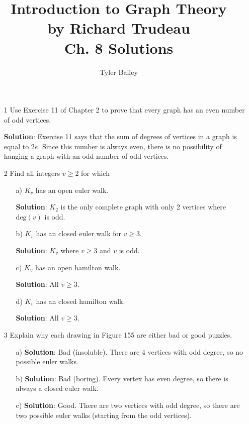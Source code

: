 \documentclass{article}
\begin{document}
	\title{%
  	Introduction to Graph Theory \\
  		\large by Richard Trudeau \\
   		Ch. 8 Solutions}
   		\author{Tyler Bailey}
	\maketitle

	\begin{enumerate}
		\item[1] Use Exercise 11 of Chapter 2 to prove that every graph has an even number of odd vertices.

		\textbf{Solution}: Exercise 11 says that the sum of degrees of vertices in a graph is equal to $2e$. Since this number is always even, there is no possibility of hanging a graph with an odd number of odd vertices. 
		
		\item[2] Find all integers $v \geq 2$ for which
		\begin{enumerate}
			\item[a)] $K_v$ has an open euler walk.

			\textbf{Solution}: $K_2$ is the only complete graph with only 2 vertices where $\mathrm{deg}(v)$ is odd.
							
			\item[b)] $K_v$ has an closed euler walk for $v \geq 3$.
			
			\textbf{Solution}: $K_v$ where $v \geq 3$ and $v$ is odd.
			
			\item[c)] $K_v$ has an open hamilton walk.
			
			\textbf{Solution}: All $v \geq 3$.
			
			\item[d)] $K_v$ has an closed hamilton walk.
			
			\textbf{Solution}: All $v \geq 3$.
		\end{enumerate}
		
		\item[3] Explain why each drawing in Figure 155 are either bad or good puzzles.
		\begin{enumerate}
			\item[a)] \textbf{Solution}: Bad (insoluble). There are 4 vertices with odd degree, so no possible euler walks.
			\item[b)] \textbf{Solution}: Bad (boring). Every vertex has even degree, so there is always a closed euler walk.
			\item[c)] \textbf{Solution}: Good. There are two vertices with odd degree, so there are two possible euler walks (starting from the odd vertices).
		\end{enumerate}
		

\end{enumerate}
\end{document}
